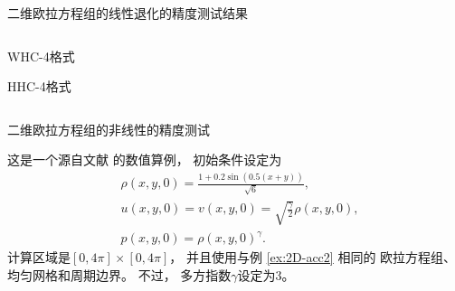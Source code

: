 \documentclass[aspectratio=169]{beamer}
\begin{document}
\begin{frame}{二维欧拉方程组的线性退化的精度测试结果}
  
  \vspace{-3mm}
  \begin{columns}
    \begin{column}{0.2\textwidth}
      
      \centering
      
      WHC-4格式
      
      \vspace{0.4\textheight}
      
      HHC-4格式
      
    \end{column}
    \begin{column}{0.8\textwidth}
      \begin{small}
        
      \end{small}
    \end{column}
  \end{columns}
  
\end{frame}

\begin{frame}{二维欧拉方程组的非线性的精度测试}
  
  \begin{example}[二维欧拉方程组的非线性的精度测试]
    \label{ex:2D-acc3}
    这是一个源自文献 \citep{Gamma3-HWENO} 的数值算例，
    初始条件设定为
    \begin{align*}
       & \rho(x, y, 0)=\frac{1+0.2\sin(0.5(x+y)) }{\sqrt{6}},        \\
       & u(x, y, 0)=v(x, y, 0)=\sqrt{\frac{\gamma}{2}}\rho(x, y, 0), \\
       & p(x, y, 0)=\rho(x, y, 0)^\gamma.
    \end{align*}
    计算区域是$[0, 4\pi]\times[0, 4\pi]$，
    并且使用与例 \ref{ex:2D-acc2} 相同的
    欧拉方程组、均匀网格和周期边界。
    不过，
    多方指数$\gamma$设定为3。
  \end{example}
  
\end{frame}
\end{document}
